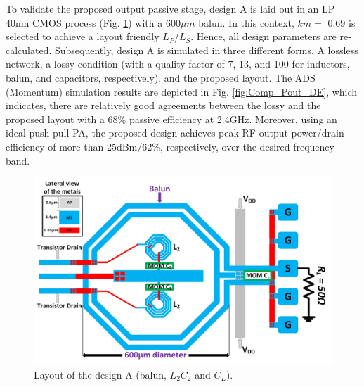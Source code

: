 \documentclass[conference]{IEEEtran}
\begin{document}
To validate the proposed output passive stage,  design A is laid out in an LP 40nm CMOS process (Fig. \ref{fig:ON_X1}) with a 600$\mu m$ balun. In this context, $km=$ 0.69 is selected to achieve a layout friendly $L_P$/$L_S$. Hence, all design parameters are re-calculated. Subsequently, design A is simulated in three different forms. A lossless network, a lossy condition (with a quality factor of 7,  13, and 100 for inductors, balun, and capacitors, respectively), and the proposed layout. The ADS (Momentum) simulation results are depicted in Fig. \ref{fig:Comp_Pout_DE}, which indicates, there are relatively good agreements between the lossy and the proposed layout with a 68\% passive efficiency at 2.4GHz. Moreover, using an ideal push-pull PA, the proposed design achieves peak RF output power/drain efficiency of more than 25dBm/62\%, respectively, over the desired frequency band. 

\begin{figure}[!t]
\centering
\captionsetup{font=footnotesize}
\includegraphics[width=1\linewidth]{Images/Output_Network_Comp/Balun_V2.jpg}
\caption{Layout of the design A (balun, $L_2C_2$ and $C_L$).}
\label{fig:ON_X1}
\vspace{-0.1in}
\end{figure}
\end{document}
